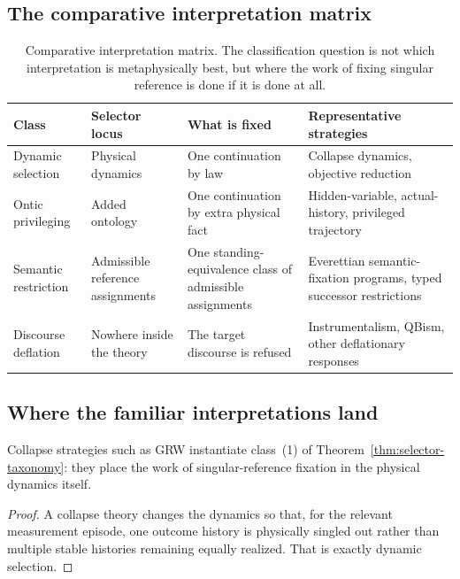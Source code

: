 \subsection{The comparative interpretation matrix}

\begin{table}[htbp]
\centering
\small
\begin{tabular}{>{\raggedright\arraybackslash}p{} >{\raggedright\arraybackslash}p{} >{\raggedright\arraybackslash}p{} >{\raggedright\arraybackslash}p{}}
\toprule
\textbf{Class} & \textbf{Selector locus} & \textbf{What is fixed} & \textbf{Representative strategies} \\
\midrule
Dynamic selection & Physical dynamics & One continuation by law & Collapse dynamics, objective reduction \\
Ontic privileging & Added ontology & One continuation by extra physical fact & Hidden-variable, actual-history, privileged trajectory \\
Semantic restriction & Admissible reference assignments & One standing-equivalence class of admissible assignments & Everettian semantic-fixation programs, typed successor restrictions \\
Discourse deflation & Nowhere inside the theory & The target discourse is refused & Instrumentalism, QBism, other deflationary responses \\
\bottomrule
\end{tabular}
\caption{Comparative interpretation matrix. The classification question is not which interpretation is
metaphysically best, but where the work of fixing singular reference is done if it is done at all.}
\label{tab:selector-taxonomy}
\end{table}

\subsection{Where the familiar interpretations land}

\begin{proposition}
\label{prop:collapse-dynamic}
Collapse strategies such as GRW instantiate class~(1) of
Theorem~\ref{thm:selector-taxonomy}: they place the work of singular-reference fixation in the
physical dynamics itself.
\end{proposition}

\begin{proof}
A collapse theory changes the dynamics so that, for the relevant measurement episode, one outcome
history is physically singled out rather than multiple stable histories remaining equally realized.
That is exactly dynamic selection.
\end{proof}

